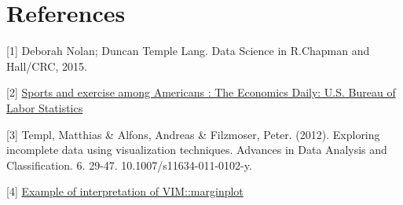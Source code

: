 \documentclass[
]{article}
\begin{document}
\hypertarget{references}{%
\section*{References}\label{references}}

{[}1{]} Deborah Nolan; Duncan Temple Lang. Data Science in R.Chapman and
Hall/CRC, 2015.

{[}2{]}
\href{https://www.bls.gov/opub/ted/2016/sports-and-exercise-among-americans.htm}{Sports
and exercise among Americans : The Economics Daily: U.S. Bureau of Labor
Statistics}

{[}3{]} Templ, Matthias \& Alfons, Andreas \& Filzmoser, Peter. (2012).
Exploring incomplete data using visualization techniques. Advances in
Data Analysis and Classification. 6. 29-47. 10.1007/s11634-011-0102-y.

{[}4{]}
\href{https://boostedml.com/2020/05/visualizing-missing-data-in-r-the-basics-with-vim.html\#The_Margin_Plot_Checking_Missing_Completely_at_Random_MCAR}{Example
of interpretation of VIM::marginplot}
\end{document}
